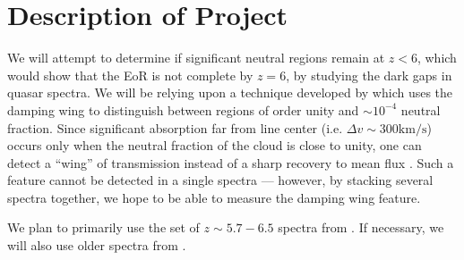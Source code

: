 \documentclass[11pt,letterpaper]{article}
\begin{document}
\section{Description of Project}
We will attempt to determine if significant neutral regions remain at $z<6$,
which would show that the EoR is not complete by $z=6$, by studying the dark
gaps in quasar spectra. We will be relying upon a technique developed by
\citet{2015ApJ...799..179M} which uses the damping wing to distinguish between
regions of order unity and $\sim10^{-4}$ neutral fraction. Since significant
absorption far from line center (i.e. $\Delta v \sim 300 \text{km}/\text{s}$)
occurs only when the neutral fraction of the cloud is close to unity, one can
detect a ``wing'' of transmission instead of a sharp recovery to mean flux
\citep[Figure~4][]{2015ApJ...799..179M}. Such a feature cannot be detected in
a single spectra --- however, by stacking several spectra together, we hope to
be able to measure the damping wing feature.

We plan to primarily use the set of $z\sim5.7-6.5$ spectra from
\citet{2018ApJ...864...53E}. If necessary, we will also use older spectra from
\citet{2006AJ....132..117F}.


\end{document}
